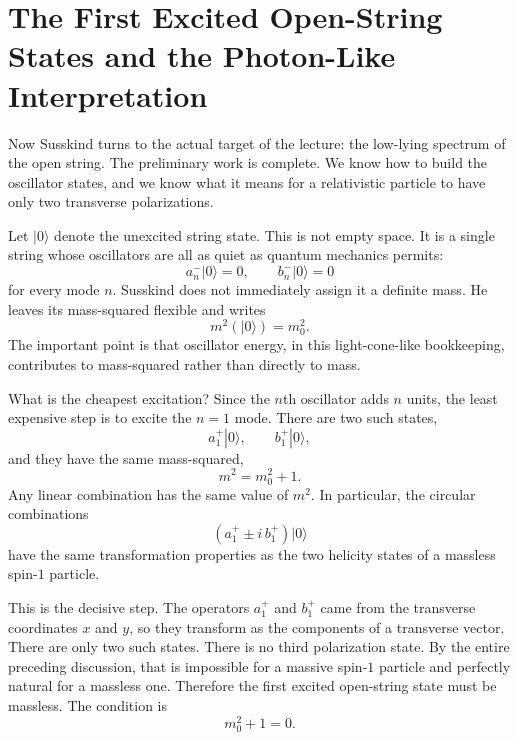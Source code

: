 \section{The First Excited Open-String States and the Photon-Like Interpretation}

Now Susskind turns to the actual target of the lecture: the low-lying spectrum of the open string. The preliminary work is complete. We know how to build the oscillator states, and we know what it means for a relativistic particle to have only two transverse polarizations.

Let \(|0\rangle\) denote the unexcited string state. This is not empty space. It is a single string whose oscillators are all as quiet as quantum mechanics permits:
\begin{equation}
a_n^-|0\rangle = 0,\qquad b_n^-|0\rangle = 0
\end{equation}
for every mode \(n\). Susskind does not immediately assign it a definite mass. He leaves its mass-squared flexible and writes
\begin{equation}
m^2(|0\rangle)=m_0^2.
\end{equation}
The important point is that oscillator energy, in this light-cone-like bookkeeping, contributes to mass-squared rather than directly to mass.

What is the cheapest excitation? Since the \(n\)th oscillator adds \(n\) units, the least expensive step is to excite the \(n=1\) mode. There are two such states,
\begin{equation}
a_1^+|0\rangle,\qquad b_1^+|0\rangle,
\end{equation}
and they have the same mass-squared,
\begin{equation}
m^2 = m_0^2+1.
\end{equation}
Any linear combination has the same value of \(m^2\). In particular, the circular combinations
\begin{equation}
\left(a_1^+ \pm i\,b_1^+\right)|0\rangle
\end{equation}
have the same transformation properties as the two helicity states of a massless spin-\(1\) particle.

This is the decisive step. The operators \(a_1^+\) and \(b_1^+\) came from the transverse coordinates \(x\) and \(y\), so they transform as the components of a transverse vector. There are only two such states. There is no third polarization state. By the entire preceding discussion, that is impossible for a massive spin-\(1\) particle and perfectly natural for a massless one. Therefore the first excited open-string state must be massless. The condition is
\begin{equation}
m_0^2+1=0.
\end{equation}

